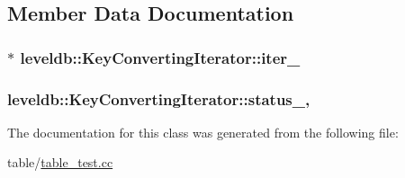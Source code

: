 \subsection{Member Data Documentation}
\hypertarget{classleveldb_1_1_key_converting_iterator_a1aabeddf10287809ee449cbbe1422956}{
\subsubsection[{iter\-\_\-}]{$\ast$ leveldb\-::\-Key\-Converting\-Iterator\-::iter\-\_\-\hspace{0.3cm}{\ttfamily [private]}}}\label{classleveldb_1_1_key_converting_iterator_a1aabeddf10287809ee449cbbe1422956}
\hypertarget{classleveldb_1_1_key_converting_iterator_a0d1a57e8266f4f10b1ad730a98c39836}{
\subsubsection[{status\-\_\-}]{ leveldb\-::\-Key\-Converting\-Iterator\-::status\-\_\-\hspace{0.3cm}{\ttfamily [mutable]}, {\ttfamily [private]}}}\label{classleveldb_1_1_key_converting_iterator_a0d1a57e8266f4f10b1ad730a98c39836}


The documentation for this class was generated from the following file\-:\begin{DoxyCompactItemize}
\item 
table/\hyperlink{table__test_8cc}{table\-\_\-test.\-cc}\end{DoxyCompactItemize}

